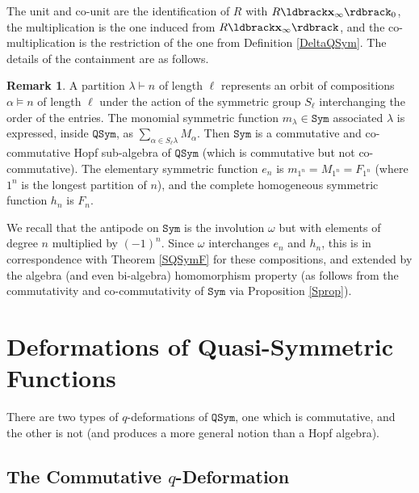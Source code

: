 \documentclass{article}
\theoremstyle{definition}
\newtheorem{rmk}[thm]{Remark}
\begin{document}
The unit and co-unit are the identification of $R$ with $R\ldbrack\mathbf{x}_{\infty}\rdbrack_{0}$, the multiplication is the one induced from $R\ldbrack\mathbf{x}_{\infty}\rdbrack$, and the co-multiplication is the restriction of the one from Definition \ref{DeltaQSym}. The details of the containment are as follows.
\begin{rmk}
A partition $\lambda \vdash n$ of length $\ell$ represents an orbit of compositions $\alpha \vDash n$ of length $\ell$ under the action of the symmetric group $S_{\ell}$ interchanging the order of the entries. The monomial symmetric function $m_{\lambda}\in\mathtt{Sym}$ associated $\lambda$ is expressed, inside $\mathtt{QSym}$, as $\sum_{\alpha \in S_{\ell}\lambda}M_{\alpha}$. Then $\mathtt{Sym}$ is a commutative and co-commutative Hopf sub-algebra of $\mathtt{QSym}$ (which is commutative but not co-commutative). The elementary symmetric function $e_{n}$ is $m_{1^{n}}=M_{1^{n}}=F_{1^{n}}$ (where $1^{n}$ is the longest partition of $n$), and the complete homogeneous symmetric function $h_{n}$ is $F_{n}$. \label{SymQSym}
\end{rmk}
We recall that the antipode on $\mathtt{Sym}$ is the involution $\omega$ but with elements of degree $n$ multiplied by $(-1)^{n}$. Since $\omega$ interchanges $e_{n}$ and $h_{n}$, this is in correspondence with Theorem \ref{SQSymF} for these compositions, and extended by the algebra (and even bi-algebra) homomorphism property (as follows from the commutativity and co-commutativity of $\mathtt{Sym}$ via Proposition \ref{Sprop}).

\section{Deformations of Quasi-Symmetric Functions \label{qDefs}}

There are two types of $q$-deformations of $\mathtt{QSym}$, one which is commutative, and the other is not (and produces a more general notion than a Hopf algebra).

\subsection{The Commutative $q$-Deformation}
\end{document}
